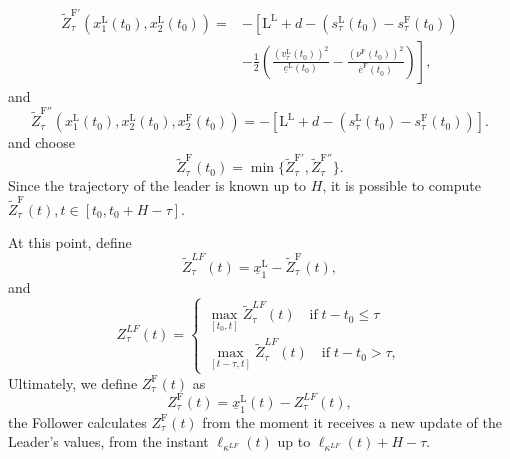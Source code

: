 \begin{equation*}
	\begin{aligned}
		{\tilde{Z}_{\tau}^{\mathrm{F}'}}\left(x_1^\mathrm{L}\left(t_0\right),x_2^\mathrm{L}\left(t_0\right)\right) =& - \left[ \mathrm{L}^\mathrm{L} + d - \left( s_{\tau}^\mathrm{L}\left(t_0\right) - s_{\tau}^\mathrm{F}\left(t_0\right) \right) \right. \\
		&\left.-\frac{1}{2}\left( \frac{\left(v_{\tau}^\mathrm{L}\left(t_0\right)\right)^2}{\underline{e}^\mathrm{L}\left(t_0\right)} - \frac{\left(\nu^\mathrm{F}\left(t_0\right)\right)^2}{\overline{e}^\mathrm{F}\left(t_0\right)} \right) \right],
	\end{aligned}
\end{equation*}
%
and
%
\begin{equation*}
	{\tilde{Z}_{\tau}^{\mathrm{F}''}}\left(x_1^\mathrm{L}\left(t_0\right),x_2^\mathrm{L}\left(t_0\right),x_2^\mathrm{F}\left(t_0\right)\right)= - \left[ \mathrm{L}^\mathrm{L} +d - \left( s_{\tau}^\mathrm{L}\left(t_0\right) - s_{\tau}^\mathrm{F}\left(t_0\right) \right) \right].
\end{equation*}
%
and choose 
%
\begin{equation*}
	{\tilde{Z}_{\tau}^{\mathrm{F}}}\left(t_0\right)= \min\{{\tilde{Z}_{\tau}^{\mathrm{F}'}}, {\tilde{Z}_{\tau}^{\mathrm{F}''}} \}.
\end{equation*}
%
Since the trajectory of the leader is known up to $H$, it is possible to compute  $\tilde{Z}_{\tau}^\mathrm{F}\left(t\right), t \in \left[ t_0, t_0+H-\tau \right]$.

At this point, define 
%
\begin{equation*}
	{\tilde{Z}_{\tau}^{LF}}\left(t\right)= \underline{x}_1^\mathrm{L}-{\tilde{Z}_{\tau}^{\mathrm{F}}}\left(t\right),
\end{equation*}
%
and
%
\begin{equation*}
	{Z}_{\tau}^{LF}\left(t\right)=
	\begin{cases}
		\max_{\left[t_0,t\right]} {\tilde{Z}_{\tau}^{LF}}\left(t\right)   \quad \text{if} \; t-t_0 \leq \tau \\
		\max_{\left[t-\tau,t\right]} {\tilde{Z}_{\tau}^{LF}}\left(t\right)   \quad \text{if} \; t-t_0 > \tau ,
	\end{cases}
\end{equation*}
%
Ultimately, we define  $Z_{\tau}^\mathrm{F}\left(t\right)$ as
%
\begin{equation}
	Z_{\tau}^\mathrm{F}\left(t\right) = \underline{x}_1^\mathrm{L}\left(t\right)-{Z}_{\tau}^{LF}\left(t\right),
\end{equation}
the Follower calculates $Z_{\tau}^\mathrm{F}\left(t\right)$ from the moment it receives a new update of the Leader's values, from the instant $\ell_{\kappa^{LF}}(t)$ up to $\ell_{\kappa^{LF}}(t)+H-\tau$.


